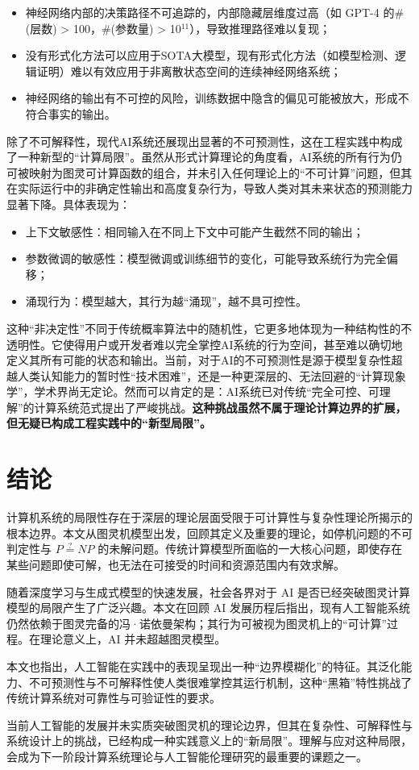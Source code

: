 \documentclass[UTF8,openany,zihao=5]{ctexbook}
\begin{document}
\begin{itemize}[noitemsep, topsep=0pt]
  \item 神经网络内部的决策路径不可追踪的，内部隐藏层维度过高（如 GPT-4 的$\#$(层数) > 100，$\#$(参数量) > 10$^{11}$），导致推理路径难以复现；
  \item 没有形式化方法可以应用于SOTA大模型，现有形式化方法（如模型检测、逻辑证明）难以有效应用于非离散状态空间的连续神经网络系统；
  \item 神经网络的输出有不可控的风险，训练数据中隐含的偏见可能被放大，形成不符合事实的输出。
\end{itemize}

除了不可解释性，现代AI系统还展现出显著的不可预测性，这在工程实践中构成了一种新型的“计算局限”。虽然从形式计算理论的角度看，AI系统的所有行为仍可被映射为图灵可计算函数的组合，并未引入任何理论上的“不可计算”问题，但其在实际运行中的非确定性输出和高度复杂行为，导致人类对其未来状态的预测能力显著下降。具体表现为：

\begin{itemize}[noitemsep, topsep=0pt]
  \item 上下文敏感性：相同输入在不同上下文中可能产生截然不同的输出；
  \item 参数微调的敏感性：模型微调或训练细节的变化，可能导致系统行为完全偏移；
  \item 涌现行为：模型越大，其行为越“涌现”，越不具可控性。
\end{itemize}

这种“非决定性”不同于传统概率算法中的随机性，它更多地体现为一种结构性的不透明性。它使得用户或开发者难以完全掌控AI系统的行为空间，甚至难以确切地定义其所有可能的状态和输出。当前，对于AI的不可预测性是源于模型复杂性超越人类认知能力的暂时性“技术困难”，还是一种更深层的、无法回避的“计算现象学”，学术界尚无定论。然而可以肯定的是：AI系统已对传统“完全可控、可理解”的计算系统范式提出了严峻挑战。\textbf{这种挑战虽然不属于理论计算边界的扩展，但无疑已构成工程实践中的“新型局限”。}

\chapter{结论}
\label{sec:conclusion}

计算机系统的局限性存在于深层的理论层面受限于可计算性与复杂性理论所揭示的根本边界。本文从图灵机模型出发，回顾其定义及重要的理论，如停机问题的不可判定性与 $P \stackrel{?}{=} NP$ 的未解问题。传统计算模型所面临的一大核心问题，即使存在某些问题即使可解，也无法在可接受的时间和资源范围内有效求解。

随着深度学习与生成式模型的快速发展，社会各界对于 AI 是否已经突破图灵计算模型的局限产生了广泛兴趣。本文在回顾 AI 发展历程后指出，现有人工智能系统仍然依赖于图灵完备的冯·诺依曼架构；其行为可被视为图灵机上的“可计算”过程。在理论意义上，AI 并未超越图灵模型。

本文也指出，人工智能在实践中的表现呈现出一种“边界模糊化”的特征。其泛化能力、不可预测性与不可解释性使人类很难掌控其运行机制，这种“黑箱”特性挑战了传统计算系统对可靠性与可验证性的要求。

当前人工智能的发展并未实质突破图灵机的理论边界，但其在复杂性、可解释性与系统设计上的挑战，已经构成一种实践意义上的“新局限”。理解与应对这种局限，会成为下一阶段计算系统理论与人工智能伦理研究的最重要的课题之一。




\end{document}
